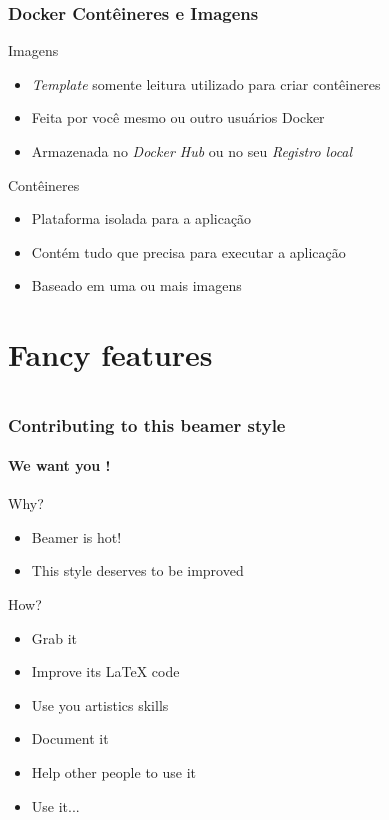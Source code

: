 \documentclass[12pt]{beamer}
\begin{document}
\begin{frame}
  \frametitle{Docker Contêineres e Imagens}
	\begin{block}{Imagens}
		\begin{itemize}
			\item \emph{Template} somente leitura utilizado para criar contêineres
			\pause
			\item Feita por você mesmo ou outro usuários Docker
			\pause
			\item Armazenada no \emph{Docker Hub} ou no seu \emph{Registro local}
			\pause
		\end{itemize}
	\end{block}
	\begin{block}{Contêineres}
		\begin{itemize}
			\item Plataforma isolada para a aplicação
			\pause
			\item Contém tudo que precisa para executar a aplicação
			\pause
			\item Baseado em uma ou mais imagens
			\pause
		\end{itemize}
	\end{block}
\end{frame}
\section{Fancy features}

\section*{}
\begin{frame}
  \frametitle{Contributing to this beamer style}
  \framesubtitle{We want you !}

  \begin{block}{Why?}
  \begin{itemize}
    \item Beamer is hot!
    \item This style deserves to be improved
  \end{itemize}
  \end{block}

  \begin{block}{How?}
  \begin{itemize}
    \item Grab it
    \item Improve its LaTeX code
    \item Use you artistics skills
    \item Document it
    \item Help other people to use it
    \item Use it...
  \end{itemize}
  \end{block}
\end{frame}
\end{document}
